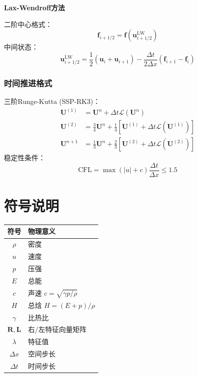 \documentclass[UTF8]{ctexart}
\begin{document}
\textbf{Lax-Wendroff方法}

二阶中心格式：
\begin{equation}
\mathbf{f}_{i+1/2} = \mathbf{f}\left( \mathbf{u}_{i+1/2}^{\text{LW}} \right)
\end{equation}
中间状态：
\begin{equation}
\mathbf{u}_{i+1/2}^{\text{LW}} = \frac{1}{2} (\mathbf{u}_i + \mathbf{u}_{i+1}) - \frac{\Delta t}{2\Delta x} (\mathbf{f}_{i+1} - \mathbf{f}_i)
\end{equation}

\subsubsection{时间推进格式}
三阶Runge-Kutta (SSP-RK3)：
\begin{align}
\mathbf{U}^{(1)} &= \mathbf{U}^n + \Delta t \mathcal{L}(\mathbf{U}^n) \\
\mathbf{U}^{(2)} &= \frac{3}{4}\mathbf{U}^n + \frac{1}{4}\left[ \mathbf{U}^{(1)} + \Delta t \mathcal{L}(\mathbf{U}^{(1)}) \right] \\
\mathbf{U}^{n+1} &= \frac{1}{3}\mathbf{U}^n + \frac{2}{3}\left[ \mathbf{U}^{(2)} + \Delta t \mathcal{L}(\mathbf{U}^{(2)}) \right]
\end{align}
稳定性条件：
\begin{equation}
\text{CFL} = \max \left( |u| + c \right) \frac{\Delta t}{\Delta x} \leq 1.5
\end{equation}

\newpage
\section*{符号说明}
\begin{table}[h]
\centering
\begin{tabular}{c|l}
\hline
符号 & 物理意义 \\
\hline
$\rho$ & 密度 \\
$u$ & 速度 \\
$p$ & 压强 \\
$E$ & 总能 \\
$c$ & 声速 $c = \sqrt{\gamma p / \rho}$ \\
$H$ & 总焓 $H = (E + p)/\rho$ \\
$\gamma$ & 比热比 \\
$\mathbf{R},\mathbf{L}$ & 右/左特征向量矩阵 \\
$\lambda$ & 特征值 \\
$\Delta x$ & 空间步长 \\
$\Delta t$ & 时间步长 \\
\hline
\end{tabular}
\end{table}
\end{document}
